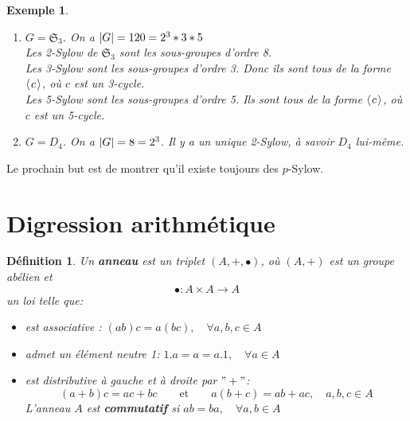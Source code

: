 \documentclass[a4paper, oneside]{report}
\theoremstyle{break}
\newtheorem{definition}[thm]{Définition}
\newtheorem{exemple}[thm]{Exemple}
\DeclarePairedDelimiter\abs{\lvert}{\rvert}%
\newcommand{\pro}[1]{\langle\hspace{0.1em}#1\hspace{0.1em}\rangle}
\newcommand{\slign}{\textbf}
\begin{document}
\begin{exemple}
\begin{enumerate}
\item $G = \mathfrak{S}_3$. On a $\abs{G} = 120 = 2^3 * 3 * 5$\\
Les 2-Sylow de $\mathfrak{S}_3$ sont les sous-groupes d'ordre 8.\\
Les 3-Sylow sont les sous-groupes d'ordre 3. Donc ils sont tous de la forme $\pro{c}$, où $c$ est un 3-cycle.\\
Les 5-Sylow sont les sous-groupes d'ordre 5. Ils sont tous de la forme $\pro{c}$, où $c$ est un 5-cycle.\\
\item $G = D_4$. On a $\abs{G} = 8 = 2^3$. Il y a un unique 2-Sylow, à savoir $D_4$ lui-même.
\end{enumerate}
\end{exemple}
Le prochain but est de montrer qu'il existe toujours des $p$-Sylow.

\section{Digression arithmétique}

\begin{definition}
Un \slign{anneau} est un triplet $(A, +, \bullet)$, où $(A, +)$ est un groupe abélien et
\[
\bullet : A \times A \longrightarrow A
\]
un loi telle que:
\begin{itemize}[label=$\bullet$]
\item est associative :	\quad	$(ab)c = a(bc),	\quad	\forall a, b, c \in A$
\item admet un élément neutre 1:	\quad	$1.a = a = a.1,	\quad	\forall a \in A$
\item est distributive à gauche et à droite par $"+"$:
\[
(a + b) c = ac + bc		\qquad	\text{et}	\qquad	a(b + c) = ab + ac, \quad	a, b, c \in A
\]
L'anneau $A$ est \slign{commutatif} si $ab = ba,	\quad	\forall a, b \in A$
\end{itemize}
\end{definition}
\end{document}
